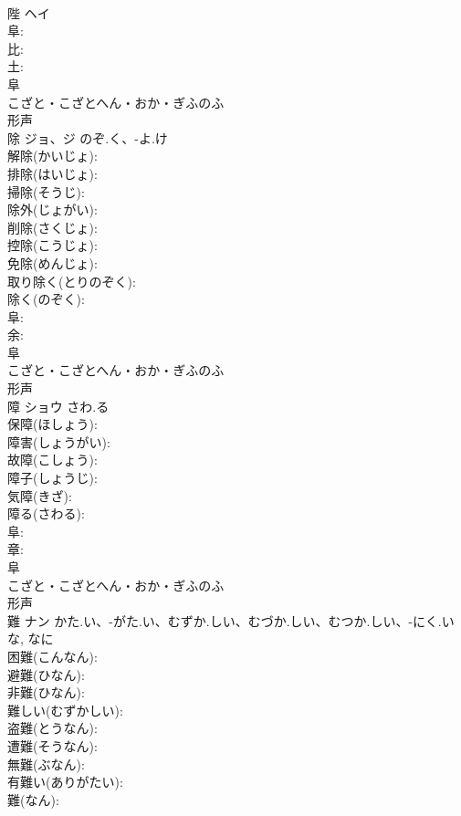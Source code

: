 \documentclass[8pt]{extreport}
\begin{document}
\begin{CJK}{UTF8}{min}
\\	陛	ヘイ			
\\	阜: 
\\	比: 
\\	土: 
\\	阜	
\\	こざと・こざとへん・おか・ぎふのふ	
\\	形声 
\\	除	ジョ、ジ	のぞ.く、-よ.け		
\\	解除(かいじょ): 
\\	排除(はいじょ): 
\\	掃除(そうじ): 
\\	除外(じょがい): 
\\	削除(さくじょ): 
\\	控除(こうじょ): 
\\	免除(めんじょ): 
\\	取り除く(とりのぞく): 
\\	除く(のぞく): 
\\	阜: 
\\	余: 
\\	阜	
\\	こざと・こざとへん・おか・ぎふのふ	
\\	形声 
\\	障	ショウ	さわ.る		
\\	保障(ほしょう): 
\\	障害(しょうがい): 
\\	故障(こしょう): 
\\	障子(しょうじ): 
\\	気障(きざ): 
\\	障る(さわる): 
\\	阜: 
\\	章: 
\\	阜	
\\	こざと・こざとへん・おか・ぎふのふ	
\\	形声 
\\	難	ナン	かた.い、-がた.い、むずか.しい、むづか.しい、むつか.しい、-にく.い	な, なに	
\\	困難(こんなん): 
\\	避難(ひなん): 
\\	非難(ひなん): 
\\	難しい(むずかしい): 
\\	盗難(とうなん): 
\\	遭難(そうなん): 
\\	無難(ぶなん): 
\\	有難い(ありがたい): 
\\	難(なん): 

\end{CJK}
\end{document}
